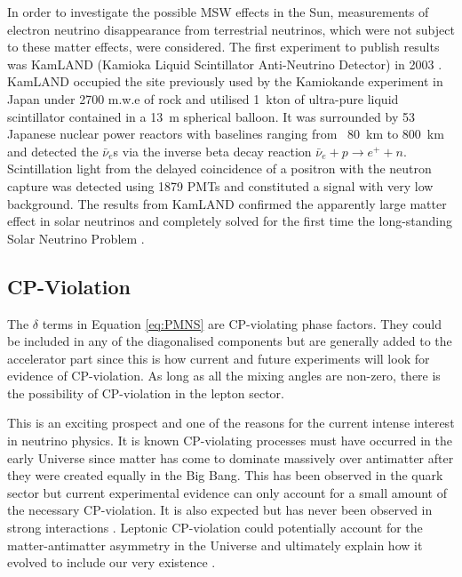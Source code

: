 In order to investigate the possible MSW effects in the Sun, measurements of electron neutrino disappearance from terrestrial neutrinos, which were not subject to these matter effects, were considered.  The first experiment to publish results was KamLAND (Kamioka Liquid Scintillator Anti-Neutrino Detector) in 2003 \cite{KamLAND2003,KamLAND2005}.  KamLAND occupied the site previously used by the Kamiokande experiment in Japan under 2700 m.w.e of rock and utilised 1~kton of ultra-pure liquid scintillator contained in a 13~m spherical balloon.  It was surrounded by 53 Japanese nuclear power reactors with baselines ranging from ~80~km to 800~km and detected the $\bar{\nu}_e$s via the inverse beta decay reaction $\bar{\nu}_e + p \rightarrow e^+ + n$.  Scintillation light from the delayed coincidence of a positron with the neutron capture was detected using 1879 PMTs and constituted a signal with very low background.  The results from KamLAND confirmed the apparently large matter effect in solar neutrinos and completely solved for the first time the long-standing Solar Neutrino Problem \cite{Bandyopadhyay2002,deHolanda2002,Fogli2003}.

\subsection{CP-Violation}\label{sec:CPViolation}

The $\delta$ terms in Equation \ref{eq:PMNS} are CP-violating phase factors.  They could be included in any of the diagonalised components but are generally added to the accelerator part since this is how current and future experiments will look for evidence of CP-violation.  As long as all the mixing angles are non-zero, there is the possibility of CP-violation in the lepton sector.

This is an exciting prospect and one of the reasons for the current intense interest in neutrino physics.  It is known CP-violating processes must have occurred in the early Universe since matter has come to dominate massively over antimatter after they were created equally in the Big Bang.  This has been observed in the quark sector but current experimental evidence can only account for a small amount of the necessary CP-violation.  It is also expected but has never been observed in strong interactions \cite{Mannel2007}.  Leptonic CP-violation could potentially account for the matter-antimatter asymmetry in the Universe and ultimately explain how it evolved to include our very existence \cite{Ohlsson2012,Ohlsson2013}.

